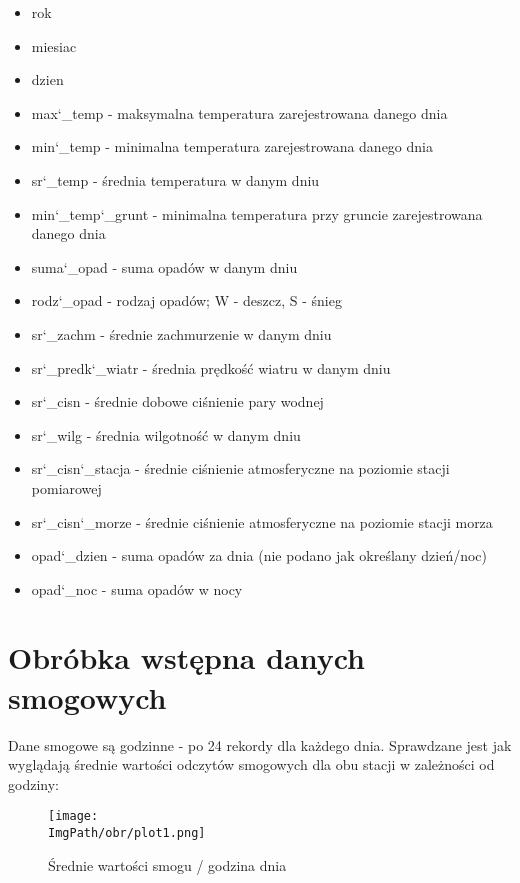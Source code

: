 \documentclass[a4paper,12pt,twoside,openany]{report}
\newcommand{\ImgPath}{.}
\begin{document}
\begin{itemize}
	\item rok
	\item miesiac
	\item dzien
	\item max\char`_temp - maksymalna temperatura zarejestrowana danego dnia
	\item min\char`_temp - minimalna temperatura zarejestrowana danego dnia
	\item sr\char`_temp - średnia temperatura w danym dniu
	\item min\char`_temp\char`_grunt - minimalna temperatura przy gruncie zarejestrowana danego dnia
	\item suma\char`_opad - suma opadów w danym dniu
	\item rodz\char`_opad - rodzaj opadów; W - deszcz, S - śnieg
	\item sr\char`_zachm - średnie zachmurzenie w danym dniu
	\item sr\char`_predk\char`_wiatr - średnia prędkość wiatru w danym dniu
	\item sr\char`_cisn - średnie dobowe ciśnienie pary wodnej
	\item sr\char`_wilg - średnia wilgotność w danym dniu
	\item sr\char`_cisn\char`_stacja - średnie ciśnienie atmosferyczne na poziomie stacji pomiarowej
	\item sr\char`_cisn\char`_morze - średnie ciśnienie atmosferyczne na poziomie stacji morza
	\item opad\char`_dzien - suma opadów za dnia (nie podano jak określany dzień/noc)
	\item opad\char`_noc - suma opadów w nocy
\end{itemize}

\section{Obróbka wstępna danych smogowych}

Dane smogowe są godzinne - po 24 rekordy dla każdego dnia. Sprawdzane jest jak wyglądają średnie wartości odczytów smogowych dla obu stacji w zależności od godziny:

\begin{figure}[H]
	\begin{center}
		\centering
		\texttt{[image: \\ImgPath/obr/plot1.png]}
	\end{center}
	\caption{Średnie wartości smogu / godzina dnia}
	\label{plot1}
\end{figure}
\end{document}
